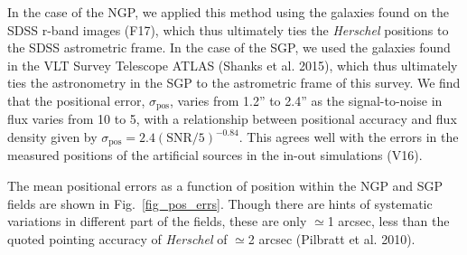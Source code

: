 \documentclass[useAMS,usenatbib]{mnras}
\begin{document}
In the case of the NGP, we applied this method using the galaxies
found on the SDSS r-band images (F17), which thus ultimately ties the
{\it Herschel} positions to the SDSS astrometric frame.  In the case
of the SGP, we used the galaxies found in the VLT Survey Telescope
ATLAS (Shanks et al.  2015), which thus ultimately ties the
astronometry in the SGP to the astrometric frame of this survey.  We
find that the positional error, $\sigma_\mathrm{pos}$, varies from
1.2'' to 2.4'' as the signal-to-noise in flux varies from 10 to 5,
with a relationship between positional accuracy and flux density given
by $\sigma_\mathrm{pos} = 2.4 (\mathrm{SNR}/5)^{-0.84}$.  This agrees
well with the errors in the measured positions of the artificial
sources in the in-out simulations (V16).


The mean positional errors as a function of position within the NGP
and SGP fields are shown in Fig.~\ref{fig_pos_errs}. Though there are
hints of systematic variations in different part of the fields, these
are only $\simeq$1 arcsec, less than the quoted pointing accuracy of
{\it Herschel} of $\simeq$2 arcsec (Pilbratt et al. 2010).
\end{document}
